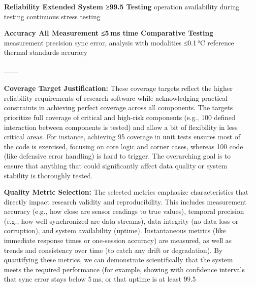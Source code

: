 \documentclass[11pt,a4paper]{report}
\begin{document}
  \textbf{Reliability   Extended       System         ≥99.5%
  Testing}       operation      availability   during testing continuous
                                                               stress testing

  \textbf{Accuracy      All            Measurement    ≤5 ms time     Comparative
  Testing}       measurement    precision      sync error,    analysis with
                  modalities                    ≤0.1 °C        reference
                                                thermal        standards
                                                accuracy       
  ------------------------------------------------------------------------------------------------------------------

\textbf{Coverage Target Justification:} These coverage targets reflect the
higher reliability requirements of research software while acknowledging
practical constraints in achieving perfect coverage across all
components\cite{ElectrodermalActivityWiki}.
The targets prioritize full coverage of critical and high-risk
components (e.g., 100%
defined interaction between components is tested) and allow a bit of
flexibility in less critical areas. For instance, achieving 95%
coverage in unit tests ensures most of the code is exercised, focusing
on core logic and corner cases, whereas 100%
code (like defensive error handling) is hard to trigger. The overarching
goal is to ensure that anything that could significantly affect data
quality or system stability is thoroughly tested.

\textbf{Quality Metric Selection:} The selected metrics emphasize
characteristics that directly impact research validity and
reproducibility\cite{DeviceServer}.
This includes measurement accuracy (e.g., how close are sensor readings
to true values), temporal precision (e.g., how well synchronized are
data streams), data integrity (no data loss or corruption), and system
availability (uptime). Instantaneous metrics (like immediate response
times or one-session accuracy) are measured, as well as trends and
consistency over time (to catch any drift or degradation). By
quantifying these metrics, we can demonstrate scientifically that the
system meets the required performance (for example, showing with
confidence intervals that sync error stays below 5 ms, or that uptime is
at least 99.5%
\end{document}
